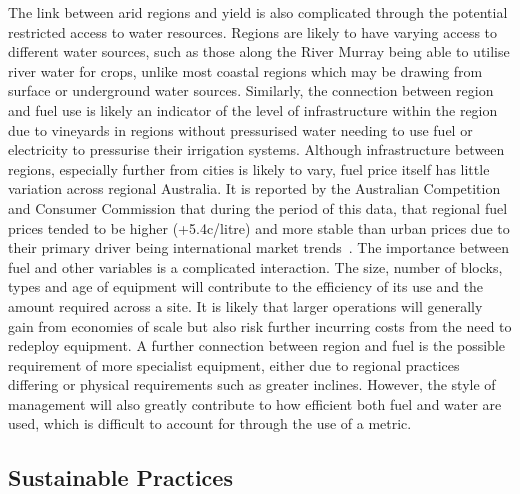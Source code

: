 \documentclass[review,12pt,authoryear]{elsarticle}
\begin{document}
\begin{linenumbers}
The link between arid regions and yield is also complicated through the potential restricted access to water resources. Regions are likely to have varying access to different water sources, such as those along the River Murray being able to utilise river water for crops, unlike most coastal regions which may be drawing from surface or underground water sources. Similarly, the connection between region and fuel use is likely an indicator of the level of infrastructure within the region due to vineyards in regions without pressurised water needing to use fuel or electricity to pressurise their irrigation systems. Although infrastructure between regions, especially further from cities is likely to vary, fuel price itself has little variation across regional Australia. It is reported by the Australian Competition and Consumer Commission that during the period of this data, that regional fuel prices tended to be higher (+5.4c/litre) and more stable than urban prices due to their primary driver being international market trends~\citep{aipFactsPricesRegional2019}. The importance between fuel and other variables is a complicated interaction. The size, number of blocks, types and age of equipment will contribute to the efficiency of its use and the amount required across a site. It is likely that larger operations will generally gain from economies of scale but also risk further incurring costs from the need to redeploy equipment. A further connection between region and fuel is the possible requirement of more specialist equipment, either due to regional practices differing or physical requirements such as greater inclines. However, the style of management will also greatly contribute to how efficient both fuel and water are used, which is difficult to account for through the use of a metric.

\subsection{Sustainable Practices}


\end{linenumbers}
\end{document}
